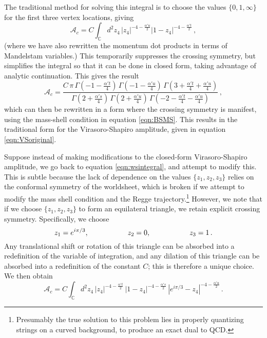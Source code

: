 \documentclass[aps, prd, preprintnumbers, floatfix, showpacs, showkeys, nofootinbib, 10pt]{revtex4-1}
\def\beq{\begin{equation}}
\def\eeq{\end{equation}}
\begin{document}
The traditional method for solving this integral is to choose the values $\{0, 1, \infty\}$ for the first three vertex locations, giving
\beq
\mathcal{A}_{c} = C\int_{\mathbb{C}} d^2 z_4 \, |z_4|^{-4 - \frac{\alpha' u}{2}}|1 - z_4|^{-4 - \frac{\alpha' t}{2}} \, ,
\eeq
(where we have also rewritten the momentum dot products in terms of Mandelstam variables.)  This temporarily suppresses the crossing symmetry, but simplifies the integral so that it can be done in closed form, taking advantage of analytic continuation.  This gives the result
\beq
\mathcal{A}_{c} = \frac{C \, \pi \, \Gamma\left(-1 - \frac{\alpha' t}{4}\right) \, \Gamma\left(-1 - \frac{\alpha' u}{4}\right) \, \Gamma\left(3 + \frac{\alpha' t}{4} + \frac{\alpha' u}{4}\right)}{\Gamma\left(2 + \frac{\alpha' s}{4}\right) \, \Gamma\left(2 + \frac{\alpha' u}{4}\right) \, \Gamma\left(-2 - \frac{\alpha' t}{4} - \frac{\alpha' u}{4}\right)} \, ,
\eeq  
which can then be rewritten in a form where the crossing symmetry is manifest, using the mass-shell condition in equation \ref{eqn:BSMS}.  This results in the traditional form for the Virasoro-Shapiro amplitude, given in equation \ref{eqn:VSoriginal}.

Suppose instead of making modifications to the closed-form Virasoro-Shapiro amplitude, we go back to equation \ref{eqn:wsintegral}, and attempt to modify this.  This is subtle because the lack of dependence on the values $\{z_1, z_2, z_3\}$ relies on the conformal symmetry of the worldsheet, which is broken if we attempt to modify the mass shell condition and the Regge trajectory.\footnote{Presumably the true solution to this problem lies in properly quantizing strings on a curved background, to produce an exact dual to QCD.}  However, we note that if we choose $\{z_1, z_2, z_3\}$ to form an equilateral triangle, we retain explicit crossing symmetry.  Specifically, we choose
\beq
z_1 = e^{i\pi/3}, \hspace{.75in} z_2 = 0, \hspace{.75in} z_3 = 1 \, .
\eeq
Any translational shift or rotation of this triangle can be absorbed into a redefinition of the variable of integration, and any dilation of this triangle can be absorbed into a redefinition of the constant $C$; this is therefore a unique choice.  We then obtain
\beq
\mathcal{A}_{c} = C\int_{\mathbb{C}} d^2 z_4 \, |z_4|^{-4 - \frac{\alpha' t}{2}} \, |1 - z_4|^{-4 - \frac{\alpha' s}{2}} \, \left|e^{i\pi/3} - z_4\right|^{-4 - \frac{\alpha' u}{2}} \, .
\eeq
\end{document}
